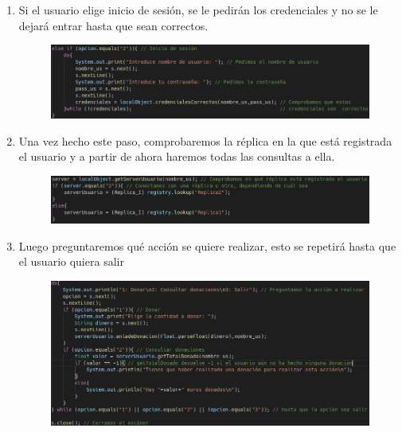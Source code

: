 \documentclass{article}
\begin{document}
\begin{enumerate}
\begin{figure}[H]
		\end{figure}
		\item Si el usuario elige inicio de sesión, se le pedirán los credenciales y no se le dejará entrar hasta que sean correctos.
		\begin{figure}[H]
			\centering
			\includegraphics[totalheight=3cm]{img/4.png}
		\end{figure}
		\item Una vez hecho este paso, comprobaremos la réplica en la que está registrada el usuario y a partir de ahora haremos todas las consultas a ella.
		 \begin{figure}[H]
		 	\centering
		 	\includegraphics[totalheight=1.91cm]{img/5.png}
		 \end{figure}
	 	\item Luego preguntaremos qué acción se quiere realizar, esto se repetirá hasta que el usuario quiera salir
	 	\begin{figure}[H]
	 		\centering
	 		\includegraphics[totalheight=5.7cm]{img/6.png}
	 	\end{figure}
	\end{enumerate}
\end{document}
